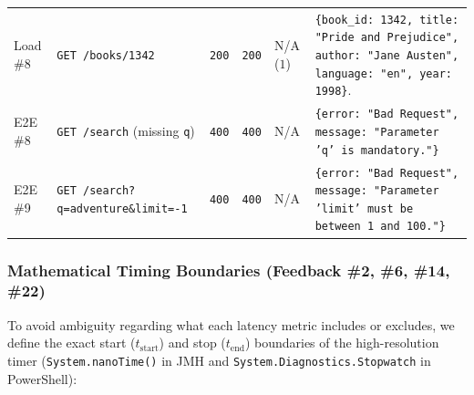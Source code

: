\documentclass[10pt,a4paper]{article}
\begin{document}
\begin{table}[!htbp]
\begin{tabularx}{\textwidth}{L{2.0cm} L{4.6cm} C{0.8cm} C{0.8cm} C{1.3cm} Y}
Load \#8 & \texttt{GET /books/1342} & \texttt{200} & \texttt{200} & N/A ($1$) & \texttt{\{book\_id: 1342, title: "Pride and Prejudice", author: "Jane Austen", language: "en", year: 1998\}}. \\
E2E \#8 & \texttt{GET /search} (missing \texttt{q}) & \texttt{400} & \texttt{400} & N/A & \texttt{\{error: "Bad Request", message: "Parameter 'q' is mandatory."\}} \\
E2E \#9 & \texttt{GET /search?q=adventure\&limit=-1} & \texttt{400} & \texttt{400} & N/A & \texttt{\{error: "Bad Request", message: "Parameter 'limit' must be between 1 and 100."\}} \\
\bottomrule
\end{tabularx}
\end{table}

\subsubsection{Mathematical Timing Boundaries (Feedback \#2, \#6, \#14, \#22)}
To avoid ambiguity regarding what each latency metric includes or excludes, we define the exact start ($t_{\text{start}}$) and stop ($t_{\text{end}}$) boundaries of the high-resolution timer (\texttt{System.nanoTime()} in JMH and \texttt{System.Diagnostics.Stopwatch} in PowerShell):
\end{document}
